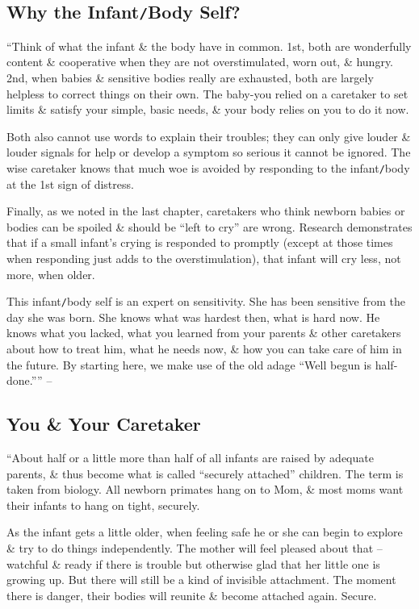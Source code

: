\documentclass{article}
\numberwithin{equation}{section}
\begin{document}
\subsection{Why the Infant{\tt/}Body Self?}
``Think of what the infant \& the body have in common. 1st, both are wonderfully content \& cooperative when they are not overstimulated, worn out, \& hungry. 2nd, when babies \& sensitive bodies really are exhausted, both are largely helpless to correct things on their own. The baby-you relied on a caretaker to set limits \& satisfy your simple, basic needs, \& your body relies on you to do it now.

Both also cannot use words to explain their troubles; they can only give louder \& louder signals for help or develop a symptom so serious it cannot be ignored. The wise caretaker knows that much woe is avoided by responding to the infant{\tt/}body at the 1st sign of distress.

Finally, as we noted in the last chapter, caretakers who think newborn babies or bodies can be spoiled \& should be ``left to cry'' are wrong. Research demonstrates that if a small infant's crying is responded to promptly (except at those times when responding just adds to the overstimulation), that infant will cry less, not more, when older.

This infant{\tt/}body self is an expert on sensitivity. She has been sensitive from the day she was born. She knows what was hardest then, what is hard now. He knows what you lacked, what you learned from your parents \& other caretakers about how to treat him, what he needs now, \& how you can take care of him in the future. By starting here, we make use of the old adage ``Well begun is half-done.'''' -- \cite[pp. 76--77]{Aron2013}

\subsection{You \& Your Caretaker}
``About half or a little more than half of all infants are raised by adequate parents, \& thus become what is called ``securely attached'' children. The term is taken from biology. All newborn primates hang on to Mom, \& most moms want their infants to hang on tight, securely.

As the infant gets a little older, when feeling safe he or she can begin to explore \& try to do things independently. The mother will feel pleased about that -- watchful \& ready if there is trouble but otherwise glad that her little one is growing up. But there will still be a kind of invisible attachment. The moment there is danger, their bodies will reunite \& become attached again. Secure.
\end{document}
